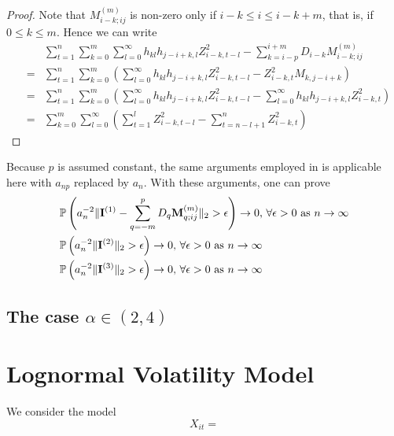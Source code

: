 \documentclass{article}
\begin{document}
\begin{proof}
  Note that $M_{i-k; ij}^{(m)}$ is non-zero only if $i-k \leq i \leq
  i-k+m$, that is, if $0 \leq k \leq m$. Hence we can write
  \begin{eqnarray*}
    && \sum_{t=1}^n \sum_{k=0}^m \sum_{l=0}^\infty h_{kl}h_{j-i+k,l}
    Z_{i-k, t-l}^2 - \sum_{k=i-p}^{i+m} D_{i-k} M_{i-k; ij}^{(m)} \\
    &=& \sum_{t=1}^n \sum_{k=0}^m \left(
      \sum_{l=0}^\infty h_{kl}h_{j-i+k,l} Z_{i-k, t-l}^2 - Z_{i-k, t}^2 M_{k,
        j-i+k} \right) \\
    &=& \sum_{t=1}^n \sum_{k=0}^m \left(
      \sum_{l=0}^\infty h_{kl}h_{j-i+k,l} Z_{i-k, t-l}^2 - \sum_{l=0}^{\infty}
      h_{kl} h_{j-i+k, l} Z_{i-k, t}^2  \right) \\
    &=& \sum_{k=0}^m \sum_{l=0}^\infty \left(
      \sum_{t=1}^l Z_{i-k, t-l}^2 - \sum_{t=n-l+1}^n Z_{i-k, t}^2
    \right)
  \end{eqnarray*}
\end{proof}

Because $p$ is assumed constant, the same arguments employed in
\cite{Mikosch2014} is applicable here with $a_{np}$ replaced by
$a_n$. With these arguments, one can prove
\begin{eqnarray*}
  &\mathbb{P}\left( a_n^{-2} \|\mathbf{I}^{(1)} - \sum_{q=-m}^p D_q \mathbf{M}_{q;
      ij}^{(m)} \|_2 > \epsilon \right) \to 0 \text{, $\forall \epsilon > 0$
    as } n \to \infty \\
  & \mathbb{P}\left(
    a_n^{-2} \|\mathbf{I}^{(2)}\|_2 > \epsilon
  \right) \to 0 \text{, } \forall \epsilon > 0 \text{ as } n \to
  \infty \\
  & \mathbb{P}\left(
    a_n^{-2} \|\mathbf{I}^{(3)}\|_2 > \epsilon
  \right) \to 0 \text{, } \forall \epsilon > 0 \text{ as } n \to \infty
\end{eqnarray*}

\subsection[alpha in (2,4)]{The case $\alpha \in (2,4)$}


\section{Lognormal Volatility Model}
We consider the model
\[
X_{it} = 
\]


\end{document}
